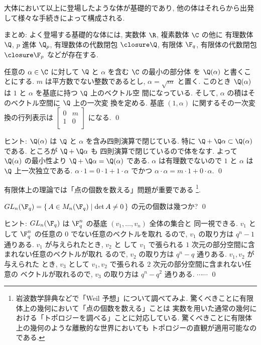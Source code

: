 \documentclass[12pt,twoside]{jarticle}
\begin{document}
大体において以上に登場したような体が基礎的であり, 
他の体はそれらから出発して様々な手続きによって構成される.  

\bigskip
{\Large まとめ: よく登場する基礎的な体には, 
  実数体 $\R$, 複素数体 $\C$ の他に
  有理数体 $\Q$, $p$ 進体 $\Q_p$, 有理数体の代数閉包 $\closure\Q$, 
  有限体 $\F_q$, 有限体の代数閉包 $\closure\F_p$ などが存在する.}
\bigskip


\begin{question}
  任意の $\alpha\in\C$ に対して $\Q$ と $\alpha$ を含む $\C$ の最小の部分体
  を $\Q(\alpha)$ と書くことにする. 
  $m$ は平方数でない整数であるとし, $\alpha=\sqrt{m}$ と置く. 
  このとき $\Q(\alpha)$ は $1$ と $\alpha$ を基底に持つ $\Q$ 上のベクトル空
  間になっている. そして, $\alpha$ の積はそのベクトル空間に $\Q$ 上の一次変
  換を定める.  基底 $(1,\alpha)$ に関するその一次変換の行列表示は $
  \begin{bmatrix}
    0 & m \\
    1 & 0 \\
  \end{bmatrix}$ になる. \qed
\end{question}

\noindent
ヒント: $\Q(\alpha)$ は $\Q$ と $\alpha$ を含み四則演算で閉じている. 
特に $\Q+\Q\alpha\subset\Q(\alpha)$ である. ところが $\Q+\Q\alpha$ も
四則演算で閉じているので体をなす. 
よって $\Q(\alpha)$ の最小性より $\Q+\Q\alpha=\Q(\alpha)$ である.
$\alpha$ は有理数でないので $1$ と $\alpha$ は $\Q$ 上一次独立である.
$\alpha\cdot 1=0\cdot1+1\cdot\alpha$
でかつ $\alpha\cdot\alpha=m\cdot1+0\cdot\alpha$.
\qed

\medskip

有限体上の理論では「点の個数を数える」問題が重要である%
\footnote{岩波数学辞典などで「Weil 予想」について調べてみよ.
  驚くべきことに有限体上の幾何において「点の個数を数える」ことは
  実数を用いた通常の幾何における「トポロジーを調べる」ことに対応している.
  驚くべきことに有限体上の幾何のような離散的な世界においても
  トポロジーの直観が適用可能なのである.}.

\begin{question}
\label{q:GL_n(F_q)}
  $GL_n(\F_q)=\{\,A\in M_n(\F_q)\mid\det A\ne0\,\}$ の元の個数は幾つか?
  \qed
\end{question}

\noindent
ヒント: $GL_n(\F_q)$ は $\F_q^n$ の基底 $(v_1,\dots,v_n)$ 全体の集合と
同一視できる. $v_1$ として $\F_q^n$ の任意の $0$ でない任意のベクトルを取れ
るので, $v_1$ の取り方は $q^n-1$ 通りある.  $v_1$ が与えられたとき, $v_2$ と
して $v_1$ で張られる $1$ 次元の部分空間に含まれない任意のベクトルが取れ
るので, $v_2$ の取り方は $q^n-q$ 通りある.  $v_1,v_2$ が与えられた
とき, $v_3$ として $v_1,v_2$ で張られる $2$ 次元の部分空間に含まれない任意の
ベクトルが取れるので, $v_3$ の取り方は $q^n-q^2$ 通りある. $\cdots\cdots$
\qed
\end{document}
